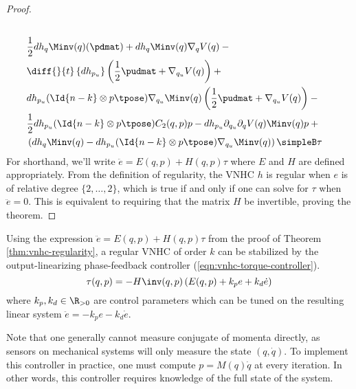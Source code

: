 \begin{proof}
\begin{align}
        \nonumber \\
     & \frac{1}{2}dh_q\Minv(q)(\pdmat) + 
        dh_q\Minv(q)\nabla_qV(q) -{} 
        \nonumber \\
     & \diff{}{t}\left\{dh_{p_u}\right\}
     \left(\frac{1}{2}\pudmat + \nabla_{q_u}V(q)\right) +{} 
     \nonumber \\
     & dh_{p_u}(\Id{n-k}\otimes p\tpose)\nabla_{q_u}\Minv(q)\left(
     \frac{1}{2}\pudmat + \nabla_{q_u}V(q)\right) -{}
     \nonumber \\
     & \frac{1}{2}dh_{p_u}(\Id{n-k}\otimes p\tpose)C_2(q,p)p - 
     dh_{p_u} \partial_{q_u}\partial_q V(q)\Minv(q)p +{} 
     \nonumber \\
     & \left(dh_q \Minv(q) - dh_{p_u}(\Id{n-k} \otimes
     p\tpose)\nabla_{q_u}\Minv(q) \right) \simpleB \tau
    \end{align}
    For shorthand, we'll write \(\ddot{e} = E(q,p) + H(q,p)\tau\) where \(E\)
    and \(H\) are defined appropriately.
    From the definition of regularity, the VNHC \(h\) is regular 
    when \(e\) is of relative degree \(\{2,\ldots,2\}\), which is true 
    if and only if
    one can solve for \(\tau\) when \(\ddot{e} = 0\).
    This is equivalent to requiring that the matrix \(H\) be
    invertible,
    proving the theorem.
\end{proof}

Using the expression \(\ddot{e} = E(q,p) + H(q,p)\tau\) from the proof of 
Theorem \ref{thm:vnhc-regularity}, a regular VNHC of order \(k\) can be
stabilized by the output-linearizing phase-feedback controller
(\ref{eqn:vnhc-torque-controller}).
\begin{equation}\label{eqn:vnhc-torque-controller}
    \tau(q,p) = -H\inv(q,p)\left(E(q,p) + k_p e + k_d \dot{e}\right)
\end{equation}
where \(k_p, k_d \in \R_{>0}\) are control parameters which can be tuned on the
resulting linear system \(\ddot{e} = -k_p e - k_d\dot{e}\). 

Note that one generally cannot measure conjugate of momenta directly, as sensors
on mechanical systems will only measure the state \((q,\dot{q})\). To
implement this controller in practice, one must compute \(p = M(q)\dot{q}\) at
every iteration. In other words, this controller requires knowledge of the full
state of the system.


